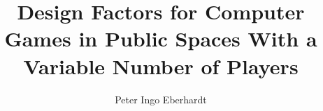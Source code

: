 \documentclass[type=bachelor,degree=engineering,theme=default,language=english,titlelanguage=english,smartquotes=true,proposal=true,aiusage=detailed]{hgbthesis}
\begin{document}


\title{Design Factors for Computer Games in Public Spaces With a Variable Number of Players}
\author{Peter Ingo Eberhardt}






\frontmatter                                   %

\maketitle
\tableofcontents

		
			

\mainmatter                                    %



\MakeBibliography                                                 %

\end{document}
